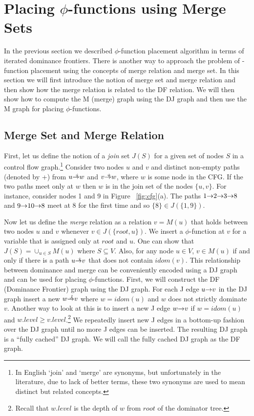 {\section{Placing $\phi$-functions using Merge Sets}

In the previous section we described $\phi$-function placement algorithm in terms of iterated dominance frontiers. There is another way to approach the problem
of \p-function placement using the concepts of merge relation and merge set. In this section
we will first introduce the notion of merge set and merge relation and then show
how the merge relation is related to the DF relation. We will then show how to compute
the M (merge) graph using the DJ graph and then use the M graph for placing $\phi$-functions.

\subsection{Merge Set and Merge Relation}

First, let us define the notion of a {\em join} set $J(S)$
 for a given set of nodes  $S$ in a control flow
graph.\footnote{In English `join' and `merge' are synonyms, 
but unfortunately
in the literature, due to lack of  better terms, these two synonyms are used to mean
distinct but related concepts.} Consider two nodes $u$ and $v$ and distinct non-empty
paths (denoted by +) from $u \st{+} w$ and $v \st{+} w$, where $w$ is some node in the CFG. If the 
two paths meet only at $w$ then $w$ is in the join set of the nodes $\{u, v\}$. 
For instance, consider nodes 1 and 9 in Figure ~\ref{fig:cfg}(a).
The paths $1 \st{} 2 \st{} 3 \st{} 8$ and $9 \st{} 10 \st{} 8$ meet at $8$ 
for the first time and so $\{8\} \in J(\{1,9\})$. 

Now let us define the {\em merge} relation as a relation 
$v=M(u)$ that holds between two nodes $u$ and $v$ whenever
$v \in J(\{root, u\})$. We insert a $\phi$-function at $v$ for a variable that is assigned
only at $root$ and $u$. One can show that $J(S) = \cup_{u \in S} M(u)$ where $S \subseteq V$. Also, for any node $u \in V$, $v \in M(u)$ if and only if
there is a path $u \st{+} v$ that does not contain $idom(v)$.  This relationship between
dominance and merge can be conveniently encoded using a DJ graph and can be used for placing 
$\phi$-functions. First, we will construct the DF (Dominance Frontier) graph using the DJ graph. For each J edge $u \st{} v$ in the DJ graph insert a new  $w \st{J} v$ where
$w = idom (u)$ and $w$ does not strictly dominate $v$. Another way to look at this is to insert a new J edge $w \st{} v$ if $w = idom(u)$ and $w.level \geq v.level$.\footnote{Recall that $w.level$ is the depth of $w$ from
$root$ of the dominator tree.} We repeatedly insert new J edges in a bottom-up fashion over the DJ graph until no more J edges can be inserted. The resulting DJ graph is a ``fully cached'' DJ graph. We will call the fully cached DJ graph as the DF graph.

}
